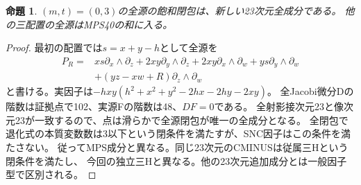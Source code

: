 \documentclass[a4paper,11pt]{ltjsarticle}
\newtheorem{proposition}{命題}[section]
\theoremstyle{definition}
\begin{document}
\begin{proposition}\label{prop:independent-three-component}
$(m,t)=(0,3)$の全源の飽和閉包は、新しい23次元全成分である。
他の三配置の全源はMPS40の和に入る。
\end{proposition}
\begin{proof}
最初の配置では$s=x+y-h$として全源を
\[
 \begin{split}
 P_R={}&xs\partial_x\wedge\partial_z+2xy\partial_y\wedge\partial_z
       +2xy\partial_x\wedge\partial_w+ys\partial_y\wedge\partial_w\\
       &+(yz-xw+R)\partial_z\wedge\partial_w
 \end{split}
\]
と書ける。実因子は$-hxy(h^2+x^2+y^2-2hx-2hy-2xy)$。
全Jacobi微分Dの階数は証拠点で102、実源Fの階数は48、$DF=0$である。
全射影接次元23と像次元23が一致するので、点は滑らかで全源閉包が唯一の全成分となる。
全閉包で退化式の本質変数数は3以下という閉条件を満たすが、SNC因子はこの条件を満たさない。
従ってMPS成分と異なる。同じ23次元のCMINUSは従属三Hという閉条件を満たし、
今回の独立三Hと異なる。他の23次元追加成分とは一般因子型で区別される。


\end{proof}
\end{document}
